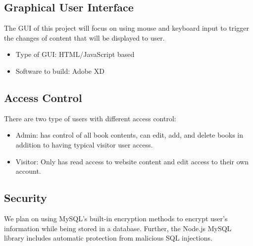 \documentclass[letter, 12pt, titlepage]{article}
\begin{document}
	\subsection{Graphical User Interface}
	The GUI of this project will focus on using mouse and keyboard input to trigger the changes of content that will be displayed to user.
	\begin{itemize}
		\item Type of GUI: HTML/JavaScript based
		\item Software to build: Adobe XD
	\end{itemize}
	\subsection{Access Control}
	There are two type of users with different access control:
	\begin{itemize}
		\item Admin: has control of all book contents, can edit, add, and delete books in addition to having typical visitor user access.
		\item Visitor: Only has read access to website content and edit access to their own account.
	\end{itemize}
	\subsection{Security}
	We plan on using MySQL's built-in encryption methods to encrypt user's information while being stored in a database. Further, the Node.js MySQL library includes automatic protection from malicious SQL injections.  
\end{document}

